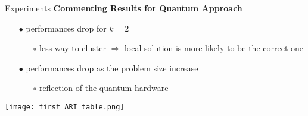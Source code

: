 		\begin{frame}{Experiments}
			\textbf{Commenting Results for Quantum Approach}
			\begin{itemize}
				\item[$\bullet$] performances drop for $k=2$
				\begin{itemize}
					\item[$\circ$] less way to cluster $\Longrightarrow$ local solution is more likely to be the correct one 
				\end{itemize}
				\item[$\bullet$] performances drop as the problem size increase 
				\begin{itemize}
					\item[$\circ$] reflection of the quantum hardware
				\end{itemize}
			\end{itemize}

			\begin{center}
				\texttt{[image: first\_ARI\_table.png]}
			\end{center}

		\end{frame}

